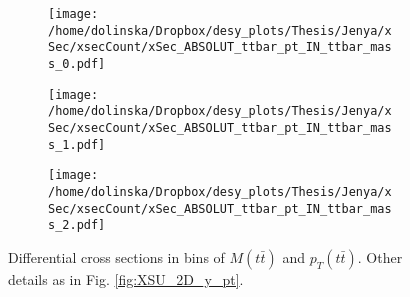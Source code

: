 \begin{figure}[p]
\centering
\begin{subfigure}
  \centering
  \texttt{[image: /home/dolinska/Dropbox/desy\_plots/Thesis/Jenya/xSec/xsecCount/xSec\_ABSOLUT\_ttbar\_pt\_IN\_ttbar\_mass\_0.pdf]}
\end{subfigure}
\begin{subfigure}
  \centering
  \texttt{[image: /home/dolinska/Dropbox/desy\_plots/Thesis/Jenya/xSec/xsecCount/xSec\_ABSOLUT\_ttbar\_pt\_IN\_ttbar\_mass\_1.pdf]}
\end{subfigure}
\begin{subfigure}
  \centering
  \texttt{[image: /home/dolinska/Dropbox/desy\_plots/Thesis/Jenya/xSec/xsecCount/xSec\_ABSOLUT\_ttbar\_pt\_IN\_ttbar\_mass\_2.pdf]}
\end{subfigure}
\caption{Differential cross sections in bins of $M(t\bar{t})$ and $p_{T}(t\bar{t})$. Other details as in Fig. \ref{fig:XSU_2D_y_pt}.}
\label{fig:XSU_2D_Mtt_pttt}
\end{figure}

